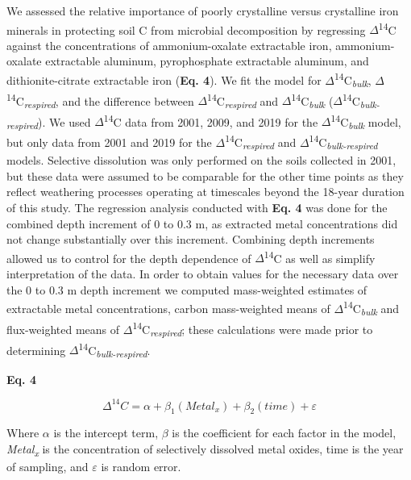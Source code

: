 \documentclass[english,man,floatsintext]{apa6}
\begin{document}
We assessed the relative importance of poorly crystalline versus crystalline iron minerals in protecting soil C from microbial decomposition by regressing \(\Delta\)\textsuperscript{14}C against the concentrations of ammonium-oxalate extractable iron, ammonium-oxalate extractable aluminum, pyrophosphate extractable aluminum, and dithionite-citrate extractable iron (\textbf{Eq. 4}). We fit the model for \(\Delta\)\textsuperscript{14}C\textsubscript{\emph{bulk}}, \(\Delta\)\textsuperscript{14}C\textsubscript{\emph{respired}}, and the difference between \(\Delta\)\textsuperscript{14}C\textsubscript{\emph{respired}} and \(\Delta\)\textsuperscript{14}C\textsubscript{\emph{bulk}} (\(\Delta\)\textsuperscript{14}C\textsubscript{\emph{bulk-respired}}). We used \(\Delta\)\textsuperscript{14}C data from 2001, 2009, and 2019 for the \(\Delta\)\textsuperscript{14}C\textsubscript{\emph{bulk}} model, but only data from 2001 and 2019 for the \(\Delta\)\textsuperscript{14}C\textsubscript{\emph{respired}} and \(\Delta\)\textsuperscript{14}C\textsubscript{\emph{bulk-respired}} models. Selective dissolution was only performed on the soils collected in 2001, but these data were assumed to be comparable for the other time points as they reflect weathering processes operating at timescales beyond the 18-year duration of this study. The regression analysis conducted with \textbf{Eq. 4} was done for the combined depth increment of 0 to 0.3 m, as extracted metal concentrations did not change substantially over this increment. Combining depth increments allowed us to control for the depth dependence of \(\Delta\)\textsuperscript{14}C as well as simplify interpretation of the data. In order to obtain values for the necessary data over the 0 to 0.3 m depth increment we computed mass-weighted estimates of extractable metal concentrations, carbon mass-weighted means of \(\Delta\)\textsuperscript{14}C\textsubscript{\emph{bulk}} and flux-weighted means of \(\Delta\)\textsuperscript{14}C\textsubscript{\emph{respired}}; these calculations were made prior to determining \(\Delta\)\textsuperscript{14}C\textsubscript{\emph{bulk-respired}}.

\textbf{Eq. 4}

\[\Delta^{14}C = \alpha + \beta_{1}(Metal_{x}) + \beta_{2}(time) + \varepsilon\]

Where \(\alpha\) is the intercept term, \(\beta\) is the coefficient for each factor in the model, \emph{Metal\textsubscript{x}} is the concentration of selectively dissolved metal oxides, time is the year of sampling, and \(\varepsilon\) is random error.
\end{document}
